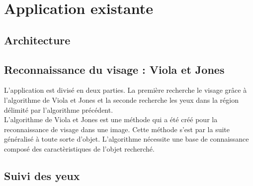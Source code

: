 \section{Application existante}


\subsection{Architecture}

\subsection{Reconnaissance du visage : Viola et Jones}
L'application est divisé en deux parties. La première recherche le visage grâce à
l'algorithme de Viola et Jones et la seconde recherche les yeux dans la région délimité
par l'algorithme précédent.\\

L'algorithme de Viola et Jones est une méthode qui a été créé pour la reconnaissance de visage dans une 
image. Cette méthode s'est par la suite généralisé à toute sorte d'objet. L'algorithme nécessite une 
base de connaissance composé des caractèristiques de l'objet recherché.

\subsection{Suivi des yeux}

